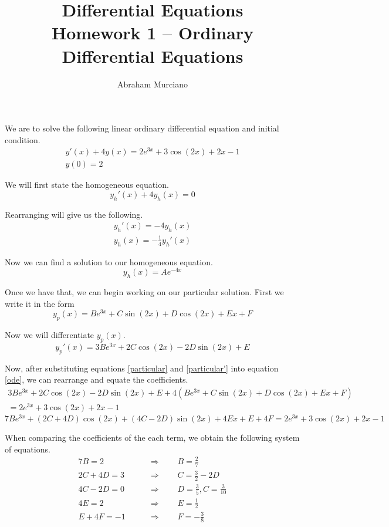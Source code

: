 \documentclass[fleqn]{article}
\title{
	Differential Equations \\
	\medskip
	\large Homework 1 -- Ordinary Differential Equations
}
\author{Abraham Murciano}
\begin{document}
\maketitle

We are to solve the following linear ordinary differential equation and initial condition.
\begin{gather}
	y'(x) + 4y(x) = 2e^{3x} + 3\cos(2x) + 2x - 1 \label{ode} \\
	y(0) = 2 \nonumber
\end{gather}

We will first state the homogeneous equation.
\begin{equation*}
	y_h'(x) + 4y_h(x) = 0
\end{equation*}

Rearranging will give us the following.
\begin{gather*}
	y_h'(x) = -4 y_h(x) \\
	y_h(x) = -\frac{1}{4}y_h'(x)
\end{gather*}

Now we can find a solution to our homogeneous equation.
\begin{equation*}
	y_h(x) = A e^{-4x}
\end{equation*}

Once we have that, we can begin working on our particular solution. First we write it in the form
\begin{equation}
	y_p(x) = B e^{3x} + C \sin(2x) + D \cos(2x) + E x + F \label{particular}
\end{equation}

Now we will differentiate \(y_p(x)\).
\begin{equation}
	y_p'(x) = 3B e^{3x} + 2C \cos(2x) - 2D \sin(2x) + E \label{particular'}
\end{equation}

Now, after substituting equations \ref{particular} and \ref{particular'} into equation \ref{ode}, we can rearrange and equate the coefficients.
\begin{multline*}
	3B e^{3x} + 2C \cos(2x) - 2D \sin(2x) + E + 4(B e^{3x} + C \sin(2x) + D \cos(2x) + E x + F) \\
	= 2e^{3x} + 3\cos(2x) + 2x - 1
\end{multline*}
\begin{equation*}
	7B e^{3x} + (2C + 4D)\cos(2x) + (4C - 2D)\sin(2x) + 4E x + E + 4F = 2e^{3x} + 3\cos(2x) + 2x - 1
\end{equation*}

When comparing the coefficients of the each term, we obtain the following system of equations.
\begin{align*}
	7B = 2 \qquad & \Rightarrow \qquad B = \frac{2}{7} \\
	2C + 4D = 3 \qquad & \Rightarrow \qquad C = \frac{3}{2} - 2D \\
	4C - 2D = 0 \qquad & \Rightarrow \qquad D = \frac{3}{5}, C = \frac{3}{10} \\
	4E = 2 \qquad & \Rightarrow \qquad E = \frac{1}{2} \\
	E + 4F = -1 \qquad & \Rightarrow \qquad F = -\frac{3}{8}
\end{align*}
\end{document}
